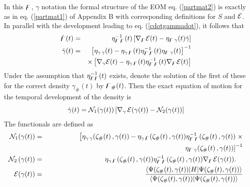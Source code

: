 In this ${\bf {\digamma }}$, $\gamma $ notation the formal structure of the
EOM eq. (\ref{partmat2}) is exactly as in eq. (\ref{partmat1}) of Appendix B
with corresponding definitions for $S$ and ${\cal E}$. In parallel with the
development leading to eq. (\ref{cdotgammadot}), it follows that 
\begin{eqnarray}
\dot{{\bf \digamma }}(t) &=&\eta _{{\bf \digamma \,\digamma }}^{-1}(t)\left[
\nabla _{{\bf \digamma }}{\cal E}(t)-\eta _{{\bf \digamma }\,\gamma }(t)\dot{%
\gamma}\right]  \nonumber \\
\dot{\gamma}(t) &=&\left[ \eta _{\gamma \,\gamma }(t)-\eta _{\gamma \,{\bf %
\digamma }}(t)\eta _{{\bf \digamma }\,{\bf \digamma }}^{-1}(t)\eta _{{\bf %
\digamma }\,\gamma }(t)\right] ^{-1}  \nonumber \\
&&\times \left[ \nabla _{\gamma }{\cal E}(t)-\eta _{\gamma \,{\bf \digamma }%
}(t)\eta _{{\bf \digamma }\,{\bf \digamma }}^{-1}(t)\nabla _{{\bf \digamma }}%
{\cal E}(t)\right]
\end{eqnarray}%
Under the assumption that $\eta _{{\bf \digamma \digamma }}^{-1}(t)$ exists,
denote the solution of the first of these for the correct density $\gamma
_{\#}(t)$ by ${\bf \digamma }_{\#}(t)$. Then the exact equation of motion
for the temporal development of the density is 
\begin{equation}
\dot{\gamma}(t)={\cal N}_{1}(\gamma (t))\left[ \nabla _{\gamma }\,{\cal E}%
(\gamma (t))-{\cal N}_{2}(\gamma (t))\right]
\end{equation}%
The functionals are defined as %
\begin{eqnarray}
{\cal N}_{1}(\gamma (t))& =&\left[ \eta _{\gamma \,\gamma }({\bf \zeta }%
_{\#}(t)\,,\gamma (t))-\eta _{\gamma \,{\bf \digamma }}({\bf \zeta }%
_{\#}(t)\,,\gamma (t))\eta _{{\bf \digamma }\,{\bf \digamma }}^{-1}({\bf %
\zeta }_{\#}(t)\,,\gamma (t))\right. \times  \nonumber \\
&& \qquad \qquad \qquad \qquad \qquad \qquad \qquad \qquad \qquad \qquad
\left. \eta _{{\bf \digamma }\,\gamma }({\bf \zeta }_{\#}(t)\,,\gamma (t))%
\right] ^{-1} \\
{\cal N}_{2}\left( \gamma (t)\right) & = &\eta _{\gamma \,{\bf \digamma }}(%
{\bf \zeta }_{\#}(t)\,,\gamma (t))\eta _{{\bf \digamma }\,{\bf \digamma }%
}^{-1}({\bf \zeta }_{\#}(t)\,,\gamma (t))\nabla _{{\bf \digamma }}{\cal E}%
(\gamma (t)).\quad \\
{\cal E}(\gamma (t))& =&\frac{\left\langle \Psi ({\bf \zeta }_{\#}(t),\gamma
(t))|H|\Psi ({\bf \zeta }_{\#}(t),\gamma (t))\right\rangle }{\left\langle
\Psi ({\bf \zeta }_{\#}(t),\gamma (t))|\Psi ({\bf \zeta }_{\#}(t),\gamma
(t))\right\rangle } 
\end{eqnarray}


